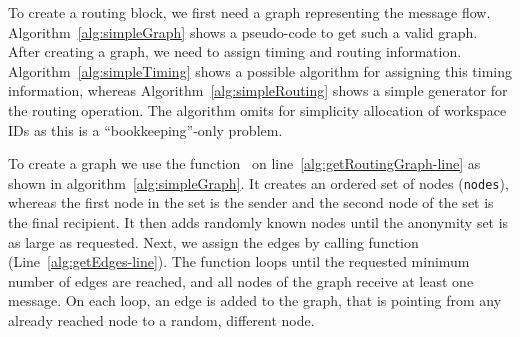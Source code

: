 To create a routing block, we first need a graph representing the message flow. Algorithm~\ref{alg:simpleGraph} shows a pseudo-code to get such a valid graph. After creating a graph, we need to assign timing and routing information. Algorithm~\ref{alg:simpleTiming} shows a possible algorithm for assigning this timing information, whereas Algorithm~\ref{alg:simpleRouting} shows a simple generator for the routing operation. The algorithm omits for simplicity allocation of workspace IDs as this is a ``bookkeeping''-only problem.

To create a graph we use the function~ on line~\ref{alg:getRoutingGraph-line} as shown in algorithm~\ref{alg:simpleGraph}. It creates an ordered set of nodes (\texttt{nodes}), whereas the first node in the set is the sender and the second node of the set is the final recipient. It then adds randomly known nodes until the anonymity set is as large as requested. Next, we assign the edges by calling function~ (Line~\ref{alg:getEdges-line}). The function loops until the requested minimum number of edges are reached, and all nodes of the graph receive at least one message. On each loop, an edge is added to the graph, that is pointing from any already reached node to a random, different node.

